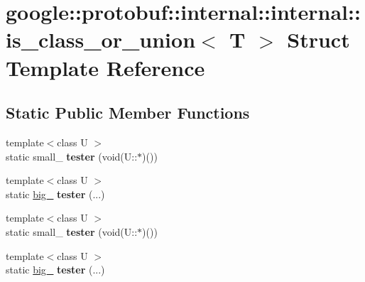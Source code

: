 \hypertarget{structgoogle_1_1protobuf_1_1internal_1_1internal_1_1is__class__or__union}{}\section{google\+:\+:protobuf\+:\+:internal\+:\+:internal\+:\+:is\+\_\+class\+\_\+or\+\_\+union$<$ T $>$ Struct Template Reference}
\label{structgoogle_1_1protobuf_1_1internal_1_1internal_1_1is__class__or__union}
\subsection*{Static Public Member Functions}
\begin{DoxyCompactItemize}
\item 
\mbox{\label{structgoogle_1_1protobuf_1_1internal_1_1internal_1_1is__class__or__union_ac1d023203a52e1fefb4d856a0ddd7010}} 
{\footnotesize template$<$class U $>$ }\\static small\+\_\+ {\bfseries tester} (void(U\+::$\ast$)())
\item 
\mbox{\label{structgoogle_1_1protobuf_1_1internal_1_1internal_1_1is__class__or__union_a40db910fcbb1e664a5af3f465c5e354d}} 
{\footnotesize template$<$class U $>$ }\\static \hyperlink{structgoogle_1_1protobuf_1_1internal_1_1big__}{big\+\_\+} {\bfseries tester} (...)
\item 
\mbox{\label{structgoogle_1_1protobuf_1_1internal_1_1internal_1_1is__class__or__union_ac1d023203a52e1fefb4d856a0ddd7010}} 
{\footnotesize template$<$class U $>$ }\\static small\+\_\+ {\bfseries tester} (void(U\+::$\ast$)())
\item 
\mbox{\label{structgoogle_1_1protobuf_1_1internal_1_1internal_1_1is__class__or__union_a40db910fcbb1e664a5af3f465c5e354d}} 
{\footnotesize template$<$class U $>$ }\\static \hyperlink{structgoogle_1_1protobuf_1_1internal_1_1big__}{big\+\_\+} {\bfseries tester} (...)
\end{DoxyCompactItemize}
